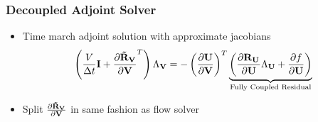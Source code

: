 \documentclass{beamer}
\begin{document}
\begin{frame}
  \frametitle{Decoupled Adjoint Solver}
  \begin{itemize}
    \item Time march adjoint solution with approximate jacobians
      \begin{equation*}
        \left( \frac{V}{\Delta t} \mathbf I + \frac{\partial \mathbf{\tilde{R}_{\mathbf V}}}{\partial \mathbf V}^T \right) \Lambda_{\mathbf V}
        =
        - \left( \frac{\partial \mathbf U}{\partial \mathbf V} \right)^T
        \underbrace{
          \left( \frac{\partial \mathbf R_{{\mathbf U}_{}}}{\partial \mathbf U} \Lambda_{\mathbf U} + \frac{\partial f}{\partial \mathbf U} \right)
        }_\text{Fully Coupled Residual}
      \end{equation*}
    \item Split $\frac{\partial \mathbf{\tilde{R}_{\mathbf V}}}{\partial \mathbf V}$ in same fashion as flow solver
  \end{itemize}
\end{frame}
\end{document}
